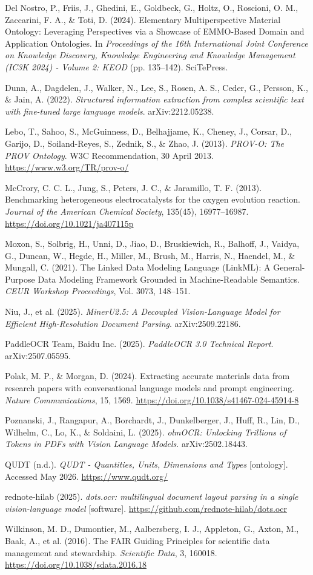 \documentclass{template}
\begin{document}
Del Nostro, P., Friis, J., Ghedini, E., Goldbeck, G., Holtz, O., Roscioni, O. M., Zaccarini, F. A., \& Toti, D. (2024). Elementary Multiperspective Material Ontology: Leveraging Perspectives via a Showcase of EMMO-Based Domain and Application Ontologies. In \textit{Proceedings of the 16th International Joint Conference on Knowledge Discovery, Knowledge Engineering and Knowledge Management (IC3K 2024) - Volume 2: KEOD} (pp. 135--142). SciTePress.

Dunn, A., Dagdelen, J., Walker, N., Lee, S., Rosen, A. S., Ceder, G., Persson, K., \& Jain, A. (2022). \textit{Structured information extraction from complex scientific text with fine-tuned large language models}. arXiv:2212.05238.

Lebo, T., Sahoo, S., McGuinness, D., Belhajjame, K., Cheney, J., Corsar, D., Garijo, D., Soiland-Reyes, S., Zednik, S., \& Zhao, J. (2013). \textit{PROV-O: The PROV Ontology}. W3C Recommendation, 30 April 2013. \url{https://www.w3.org/TR/prov-o/}

McCrory, C. C. L., Jung, S., Peters, J. C., \& Jaramillo, T. F. (2013). Benchmarking heterogeneous electrocatalysts for the oxygen evolution reaction. \textit{Journal of the American Chemical Society}, 135(45), 16977--16987. \url{https://doi.org/10.1021/ja407115p}

Moxon, S., Solbrig, H., Unni, D., Jiao, D., Bruskiewich, R., Balhoff, J., Vaidya, G., Duncan, W., Hegde, H., Miller, M., Brush, M., Harris, N., Haendel, M., \& Mungall, C. (2021). The Linked Data Modeling Language (LinkML): A General-Purpose Data Modeling Framework Grounded in Machine-Readable Semantics. \textit{CEUR Workshop Proceedings}, Vol. 3073, 148--151.

Niu, J., et al. (2025). \textit{MinerU2.5: A Decoupled Vision-Language Model for Efficient High-Resolution Document Parsing}. arXiv:2509.22186.

PaddleOCR Team, Baidu Inc. (2025). \textit{PaddleOCR 3.0 Technical Report}. arXiv:2507.05595.

Polak, M. P., \& Morgan, D. (2024). Extracting accurate materials data from research papers with conversational language models and prompt engineering. \textit{Nature Communications}, 15, 1569. \url{https://doi.org/10.1038/s41467-024-45914-8}

Poznanski, J., Rangapur, A., Borchardt, J., Dunkelberger, J., Huff, R., Lin, D., Wilhelm, C., Lo, K., \& Soldaini, L. (2025). \textit{olmOCR: Unlocking Trillions of Tokens in PDFs with Vision Language Models}. arXiv:2502.18443.

QUDT (n.d.). \textit{QUDT - Quantities, Units, Dimensions and Types} [ontology]. Accessed May 2026. \url{https://www.qudt.org/}

rednote-hilab (2025). \textit{dots.ocr: multilingual document layout parsing in a single vision-language model} [software]. \url{https://github.com/rednote-hilab/dots.ocr}

Wilkinson, M. D., Dumontier, M., Aalbersberg, I. J., Appleton, G., Axton, M., Baak, A., et al. (2016). The FAIR Guiding Principles for scientific data management and stewardship. \textit{Scientific Data}, 3, 160018. \url{https://doi.org/10.1038/sdata.2016.18}

\endgroup
\end{document}
